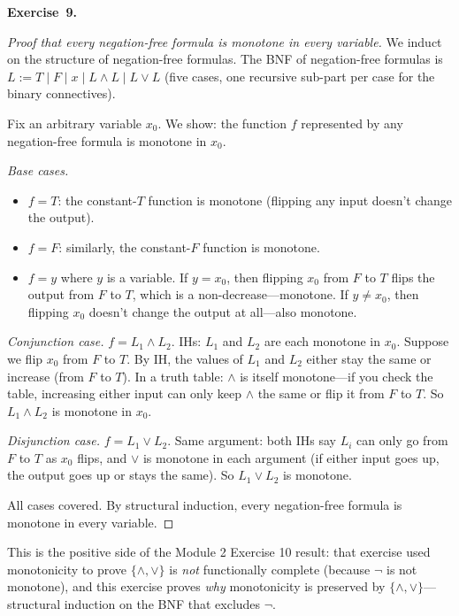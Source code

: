 \documentclass[11pt]{article}
\begin{document}
\medskip
\textbf{Exercise~9.}
\begin{proof}[Proof that every negation-free formula is monotone in every variable]
We induct on the structure of negation-free formulas. The BNF of negation-free formulas is $L := T \mid F \mid x \mid L \wedge L \mid L \vee L$ (five cases, one recursive sub-part per case for the binary connectives).

Fix an arbitrary variable $x_0$. We show: the function $f$ represented by any negation-free formula is monotone in $x_0$.

\emph{Base cases.}
\begin{itemize}
  \item $f = T$: the constant-$T$ function is monotone (flipping any input doesn't change the output). \checkmark
  \item $f = F$: similarly, the constant-$F$ function is monotone. \checkmark
  \item $f = y$ where $y$ is a variable. If $y = x_0$, then flipping $x_0$ from $F$ to $T$ flips the output from $F$ to $T$, which is a non-decrease---monotone. If $y \neq x_0$, then flipping $x_0$ doesn't change the output at all---also monotone.
\end{itemize}

\emph{Conjunction case.} $f = L_1 \wedge L_2$. IHs: $L_1$ and $L_2$ are each monotone in $x_0$. Suppose we flip $x_0$ from $F$ to $T$. By IH, the values of $L_1$ and $L_2$ either stay the same or increase (from $F$ to $T$). In a truth table: $\wedge$ is itself monotone---if you check the table, increasing either input can only keep $\wedge$ the same or flip it from $F$ to $T$. So $L_1 \wedge L_2$ is monotone in $x_0$. \checkmark

\emph{Disjunction case.} $f = L_1 \vee L_2$. Same argument: both IHs say $L_i$ can only go from $F$ to $T$ as $x_0$ flips, and $\vee$ is monotone in each argument (if either input goes up, the output goes up or stays the same). So $L_1 \vee L_2$ is monotone. \checkmark

All cases covered. By structural induction, every negation-free formula is monotone in every variable.
\end{proof}

This is the positive side of the Module 2 Exercise 10 result: that exercise used monotonicity to prove $\{\wedge, \vee\}$ is \emph{not} functionally complete (because $\lnot$ is not monotone), and this exercise proves \emph{why} monotonicity is preserved by $\{\wedge, \vee\}$---structural induction on the BNF that excludes $\lnot$.
\end{document}
